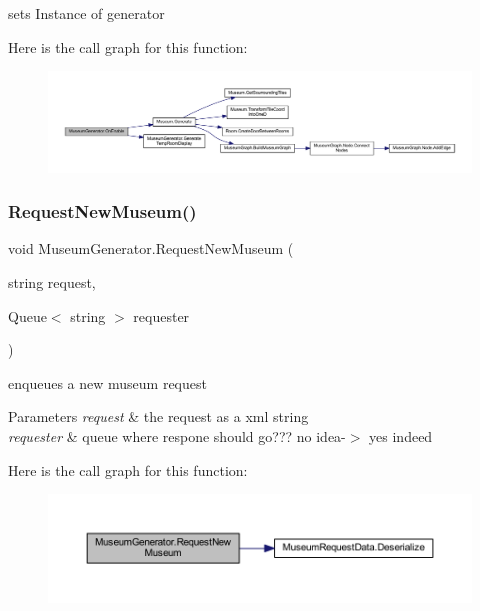 sets Instance of generator 

Here is the call graph for this function\+:
\nopagebreak
\begin{figure}[H]
\begin{center}
\leavevmode
\includegraphics[width=350pt]{class_museum_generator_abc3127d3a23107a350064fc49c5495c1_cgraph}
\end{center}
\end{figure}
\mbox{\label{class_museum_generator_a5ead852effaa81309fe98b4d61fe9759}} 
\subsubsection{\texorpdfstring{Request\+New\+Museum()}{RequestNewMuseum()}}
{\footnotesize\ttfamily void Museum\+Generator.\+Request\+New\+Museum (\begin{DoxyParamCaption}\item[{string}]{request,  }\item[{Queue$<$ string $>$}]{requester }\end{DoxyParamCaption})}



enqueues a new museum request 


\begin{DoxyParams}{Parameters}
{\em request} & the request as a xml string\\
\hline
{\em requester} & queue where respone should go??? no idea-\/$>$ yes indeed\\
\hline
\end{DoxyParams}
Here is the call graph for this function\+:
\nopagebreak
\begin{figure}[H]
\begin{center}
\leavevmode
\includegraphics[width=350pt]{class_museum_generator_a5ead852effaa81309fe98b4d61fe9759_cgraph}
\end{center}
\end{figure}
\mbox{\label{class_museum_generator_afa0b7c3e8ab1bccedc4c7828cbf4724e}} 

